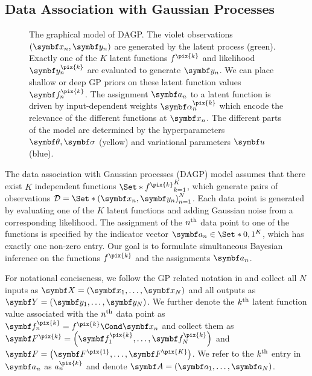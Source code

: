 \subsection{Data Association with Gaussian Processes}
\label{sub:data_association:model}
\begin{figure}[t]
    \centering
    
    \caption{
        \label{fig:data_association:data_association_graphical_model}
        The graphical model of DAGP.
        The violet observations $(\mat{x_n}, \mat{y_n})$ are generated by the latent process (green).
        Exactly one of the $K$ latent functions $f^{\pix{k}}$ and likelihood $\mat{y_n^{\pix{k}}}$ are evaluated to generate $\mat{y_n}$.
        We can place shallow or deep GP priors on these latent function values $\mat{f_n^{\pix{k}}}$.
        The assignment $\mat{a_n}$ to a latent function is driven by input-dependent weights $\mat{\alpha_n^{\pix{k}}}$ which encode the relevance of the different functions at $\mat{x_n}$.
        The different parts of the model are determined by the hyperparameters $\mat{\theta}, \mat{\sigma}$ (yellow) and variational parameters $\mat{u}$ (blue).
    }
\end{figure}
The data association with Gaussian processes (DAGP) model assumes that there exist $K$ independent functions $\Set*{f^{\pix{k}}}_{k=1}^K$, which generate pairs of observations $\Dc = \Set*{(\mat{x_n}, \mat{y_n})}_{n=1}^N$.
Each data point is generated by evaluating one of the $K$ latent functions and adding Gaussian noise from a corresponding likelihood.
The assignment of the $n^{\text{th}}$ data point to one of the functions is specified by the indicator vector $\mat{a_n} \in \Set*{0, 1}^K$, which has exactly one non-zero entry.
Our goal is to formulate simultaneous Bayesian inference on the functions $f^{\pix{k}}$ and the assignments $\mat{a_n}$.

For notational conciseness, we follow the GP related notation in \parencite{hensman_scalable_2015} and collect all $N$ inputs as $\mat{X} = \left(\mat{x_1}, \ldots, \mat{x_N}\right)$ and all outputs as $\mat{Y} = \left(\mat{y_1}, \ldots, \mat{y_N}\right)$.
We further denote the $k^{\text{th}}$ latent function value associated with the $n^{\text{th}}$ data point as $\rv{f_n^{\pix{k}}} = \Fun{f^{\pix{k}}}{\mat{x_n}}$ and collect them as $\mat{F^{\pix{k}}} = \left( \rv{f_1^{\pix{k}}}, \ldots, \rv{f_N^{\pix{k}}} \right)$ and $\mat{F} = \left( \mat{F^{\pix{1}}}, \ldots, \mat{F^{\pix{K}}} \right)$.
We refer to the $k^{\text{th}}$ entry in $\mat{a_n}$ as $a_n^{\pix{k}}$ and denote $\mat{A} = \left(\mat{a_1}, \ldots, \mat{a_N}\right)$.

